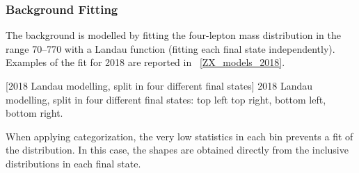 \subsubsection{Background Fitting}
The background is modelled by fitting the four-lepton mass distribution in the range 70--770\GeV
with a Landau function (fitting each final state independently).
Examples of the fit for 2018 are reported in \figurename~\ref{ZX_models_2018}.
\begin{multiFigure}
	\centering
		[2018 \ZplusX Landau modelling, split in four different final states]
		{2018 \ZplusX Landau modelling, split in four different final states:
		\fourmu top left \foure top right, \twoetwomu bottom left, \twomutwoe bottom right.}
	\label{ZX_models_2018}
\end{multiFigure}
When applying categorization, the very low statistics in each bin prevents a fit of the distribution.
In this case, the shapes are obtained directly from the inclusive distributions in each final state.



